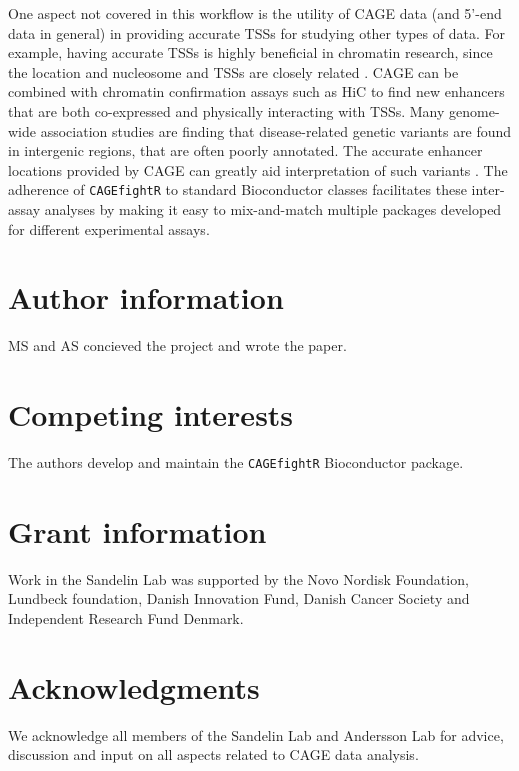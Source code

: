 \documentclass[9pt,a4paper,]{extarticle}
\begin{document}
One aspect not covered in this workflow is the utility of CAGE data (and 5'-end data in general) in providing accurate TSSs for studying other types of data. For example, having accurate TSSs is highly beneficial in chromatin research, since the location and nucleosome and TSSs are closely related \citep{Andersson2014b, Duttke2015, Thodberg2018a}. CAGE can be combined with chromatin confirmation assays such as HiC to find new enhancers that are both co-expressed and physically interacting with TSSs. Many genome-wide association studies are finding that disease-related genetic variants are found in intergenic regions, that are often poorly annotated. The accurate enhancer locations provided by CAGE can greatly aid interpretation of such variants \citep{Boyd2018}. The adherence of \texttt{CAGEfightR} to standard Bioconductor classes facilitates these inter-assay analyses by making it easy to mix-and-match multiple packages developed for different experimental assays.

\section{Author information}\label{author-information}

MS and AS concieved the project and wrote the paper.

\section{Competing interests}\label{competing-interests}

The authors develop and maintain the \texttt{CAGEfightR} Bioconductor package.

\section{Grant information}\label{grant-information}

Work in the Sandelin Lab was supported by the Novo Nordisk Foundation, Lundbeck foundation, Danish Innovation Fund, Danish Cancer Society and Independent Research Fund Denmark.

\section{Acknowledgments}\label{acknowledgments}

We acknowledge all members of the Sandelin Lab and Andersson Lab for advice, discussion and input on all aspects related to CAGE data analysis.

{\small}
\end{document}
